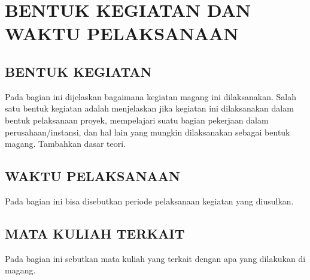 \chapter{BENTUK KEGIATAN DAN WAKTU PELAKSANAAN}
\label{chap:proposal-bentuk-kegiatan}

\paragraphtextstyle

\section{BENTUK KEGIATAN}
\label{sec:proposal-bentuk-kegiatan}

Pada bagian ini dijelaskan bagaimana kegiatan magang ini dilaksanakan. Salah satu bentuk kegiatan adalah menjelaskan jika kegiatan ini dilaksanakan dalam bentuk pelaksanaan proyek, mempelajari suatu bagian pekerjaan dalam perusahaan/\allowbreak instansi, dan hal lain yang mungkin dilaksanakan sebagai bentuk magang. Tambahkan dasar teori.

\section{WAKTU PELAKSANAAN}
\label{sec:proposal-waktu-pelaksanaan}

Pada bagian ini bisa disebutkan periode pelaksanaan kegiatan yang diusulkan.

\section{MATA KULIAH TERKAIT}
\label{sec:proposal-mata-kuliah-terkait}

Pada bagian ini sebutkan mata kuliah yang terkait dengan apa yang dilakukan di magang.
